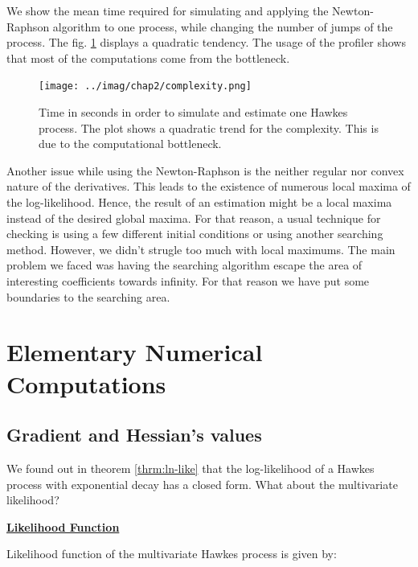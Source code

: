 \documentclass[11pt]{book}
\begin{document}
We show the mean time required for simulating and applying the Newton-Raphson algorithm to one process, while changing the number of jumps of the process. The fig. \ref{fig:complex} displays a quadratic tendency. The usage of the profiler shows that most of the computations come from the bottleneck.  

\begin{figure}
\centering
\texttt{[image: ../imag/chap2/complexity.png]}
\caption{Time in seconds in order to simulate and estimate one Hawkes process. The plot shows a quadratic trend for the complexity. This is due to the computational bottleneck.}
\label{fig:complex}
\end{figure}

Another issue while using the Newton-Raphson is the neither regular nor convex nature of the derivatives. This leads to the existence of numerous local maxima of the log-likelihood. Hence, the result of an estimation might be a local maxima instead of the desired global maxima. For that reason, a usual technique for checking is using a few different initial conditions or using another searching method. However, we didn't strugle too much with local maximums. The main problem we faced was having the searching algorithm escape the area of interesting coefficients towards infinity. For that reason we have put some boundaries to the searching area.















\section{Elementary Numerical Computations}
\subsection{Gradient and Hessian's values}
\label{subsection_R_def}

We found out in theorem \ref{thrm:ln-like} that the log-likelihood of a Hawkes process with exponential decay has a closed form. What about the multivariate likelihood?

\vspace{0.6 cm}
\underline{\textbf{Likelihood Function}}

Likelihood function of the multivariate Hawkes process is given by:
\end{document}
